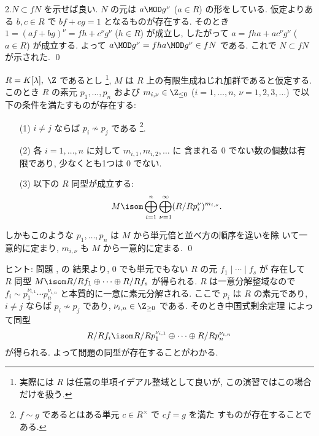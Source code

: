 \documentclass[12pt,twoside]{jarticle}
\begin{document}
2.\enspace $N\subset fN$ を示せば良い. 
$N$ の元は $a\MOD g^\nu$ ($a\in R$) の形をしている.
仮定よりある $b,c\in R$ で $bf+cg=1$ となるものが存在する.
そのとき $1=(af+bg)^\nu=fh+c^\nu g^\nu$ ($h\in R$) が成立し,
したがって $a=fha+ac^\nu g^\nu$ ($a\in R$) が成立する.
よって $a\MOD g^\nu = fha\MOD g^\nu\in fN$ である.
これで $N\subset fN$ が示された.
\qed


\begin{question}[ねじれ加群の構造定理]
\label{q:fg-torsion-PID-modules}
  $R=K[\lambda],\;\Z$ であるとし%
  \footnote{実際には $R$ は任意の単項イデアル整域として良いが, 
    この演習ではこの場合だけを扱う.}, %
  $M$ は $R$ 上の有限生成ねじれ加群であると仮定する.
  このとき $R$ の素元 $p_1,\dots,p_n$ および $m_{i,\nu}\in\Z_{\le0}$ 
  ($i=1,\dots,n$, $\nu=1,2,3,\ldots$) で以下の条件を満たすものが存在する:
  \begin{enumerate}
  \item[(1)] $i\ne j$ ならば $p_i\not\sim p_j$ である%
    \footnote{$f\sim g$ であるとはある単元 $c\in R^\times$ で $cf=g$ を満た
      すものが存在することである.}.
  \item[(2)] 各 $i=1,\dots,n$ に対して $m_{i,1},m_{i,2},\ldots$ に
    含まれる $0$ でない数の個数は有限であり, 少なくとも1つは $0$ でない.
  \item[(3)] 以下の $R$ 同型が成立する:
    \begin{equation*}
      M \isom 
      \bigoplus_{i=1}^n 
      \bigoplus_{\nu=1}^\infty 
      (R/Rp_i^\nu)^{m_{i,\nu}}.
    \end{equation*}
  \end{enumerate}
  しかもこのような $p_1,\dots,p_n$ は $M$ から単元倍と並べ方の順序を違いを除
  いて一意的に定まり, $m_{i,\nu}$ も $M$ から一意的に定まる.
  \qed
\end{question}

\noindent
ヒント: 問題 ,  の
結果より, $0$ でも単元でもない $R$ の元 $f_1\mid\cdots\mid f_s$ が
存在して $R$ 同型 $M \isom R/Rf_1\oplus\cdots\oplus R/Rf_s$ が得られる.  
$R$ は一意分解整域なので $f_i\sim p_1^{\nu_{i,1}}\cdots p_n^{\nu_{i,n}}$ 
と本質的に一意に素元分解される. 
ここで $p_i$ は $R$ の素元であり, $i\ne j$ ならば $p_i\not\sim p_j$ 
であり, $\nu_{i,n}\in\Z_{\ge0}$ である. 
そのとき中国式剰余定理  によって同型
\begin{equation*}
  R/Rf_i \isom R/Rp_1^{\nu_{i,1}}\oplus\cdots\oplus R/Rp_n^{\nu_{i,n}} 
\end{equation*}
が得られる. よって問題の同型が存在することがわかる.
\end{document}
